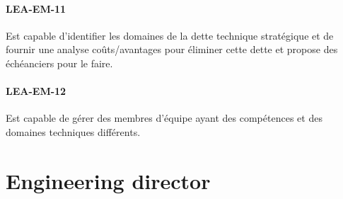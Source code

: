 \documentclass[a4paper, french, openany, 12pt]{book}
\newcommand\cha[1]{\textcolor{OliveGreen}{\textbf{\uppercase{lea-{#1}}}}}
\begin{document}
\begin{multicols}{2}
  \subsubsection*{\cha{em-11}}

  Est capable d'identifier les domaines de la dette technique stratégique et de fournir une analyse coûts/avantages pour 
  éliminer cette dette et propose des échéanciers pour le faire.
  
  \subsubsection*{\cha{em-12}}

  Est capable de gérer des membres d'équipe ayant des compétences et des domaines techniques différents.

\end{multicols}

\chapter{Engineering director}
\end{document}
